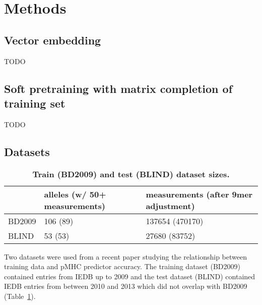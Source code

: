 \section*{Methods}
\subsection*{Vector embedding}
TODO

\subsection*{Soft pretraining with matrix completion of training set}
TODO


\subsection*{Datasets}

\begin{table}
\label{tab:datasets}
\begin{tabular}{lll}
\toprule
{} & alleles (w/ 50+ measurements) & measurements (after 9mer adjustment) \\
\midrule
BD2009 &                      106 (89) &                      137654 (470170) \\
BLIND  &                       53 (53) &                        27680 (83752) \\
\bottomrule
\end{tabular}
\caption{\textbf{Train (BD2009) and test (BLIND) dataset sizes.}}
\end{table}

Two datasets were used from a recent paper studying the relationship between training data and pMHC predictor accuracy\cite{Kim_2014}. The training dataset (BD2009) contained entries from IEDB\cite{Salimi_2012} up to 2009 and the test dataset (BLIND) contained IEDB entries from between 2010 and 2013 which did not overlap with BD2009 (Table~\ref{tab:datasets}).


